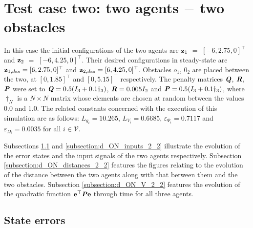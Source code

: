 \section{Test case two: two agents $-$ two obstacles}

In this case the initial configurations of the two agents are
$\bm{\mathbf{z}}_1$ $=$ $[-6, 2.75, 0]^{\top}$ and
$\bm{\mathbf{z}}_2$ $=$ $[-6, 4.25, 0]^{\top}$.
Their desired configurations in steady-state are
$\bm{\mathbf{z}}_{1,des} = [6, 2.75, 0]^{\top}$ and
$\bm{\mathbf{z}}_{2,des} = [6, 4.25, 0]^{\top}$.
Obstacles $o_1$, $0_2$ are placed between the two, at $[0, 1.85]^{\top}$
and $[0, 5.15]^{\top}$ respectively. The penalty
matrices $\bm{\mathit{Q}}$, $\bm{\mathit{R}}$, $\bm{\mathit{P}}$ were set to
$\bm{\mathit{Q}} = 0.5 (I_3 + 0.1 \dagger_3)$, $\bm{\mathit{R}} = 0.005 I_2$ and
$\bm{\mathit{P}} = 0.5 (I_3 + 0.1 \dagger_3)$, where $\dagger_N$ is a $N \times N$
matrix whose elements are chosen at random between the values $0.0$ and $1.0$.
The related constants concerned with the execution
of this simulation are as follows: $L_{g_i} = 10.265$, $L_{V_i} = 0.6685$,
$\varepsilon_{\Psi_i} = 0.7117$ and $\varepsilon_{\Omega_i} = 0.0035$ for
all $i \in \mathcal{V}$.

Subsections \ref{subsection:d_ON_errors_2_2} and
\ref{subsection:d_ON_inputs_2_2} illustrate the evolution of the error states
and the input signals of the two agents respectively. Subsection
\ref{subsection:d_ON_distances_2_2} features the figures relating to the
evolution of the distance between the two agents along with that between them
and the two obstacles. Subsection \ref{subsection:d_ON_V_2_2}
features the evolution of the quadratic function
$\bm{\mathbf{e}}^{\top} \bm{\mathit{P}} \bm{\mathbf{e}}$ through time for all three agents.


\subsection{State errors}
\label{subsection:d_ON_errors_2_2}

\noindent{}


